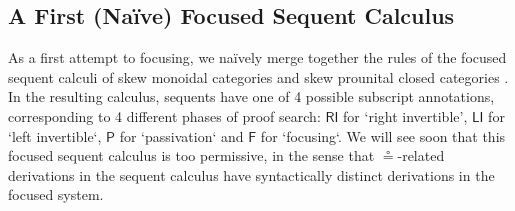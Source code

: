 \documentclass[submission,copyright,creativecommons]{eptcs}
\theoremstyle{definition}
\newcommand{\RI}{\mathsf{RI}}
\newcommand{\LI}{\mathsf{LI}}
\newcommand{\Pass}{\mathsf{P}}
\newcommand{\F}{\mathsf{F}}
\begin{document}
\subsection{A First (Na{\"i}ve) Focused Sequent Calculus}
As a first attempt to focusing, we na{\"i}vely merge together the rules of the focused sequent calculi of skew monoidal categories \cite{uustalu:sequent:2021} and skew prounital closed categories \cite{uustalu:deductive:nodate}. In the resulting calculus, sequents have one of 4 possible subscript annotations, corresponding to 4 different phases of proof search: $\RI$ for `right invertible', $\LI$ for `left invertible`, $\Pass$ for `passivation` and $\F$ for `focusing`. We will see soon that this focused sequent calculus is too permissive, in the sense that $\circeq$-related derivations in the sequent calculus have syntactically distinct derivations in the focused system.
\end{document}
